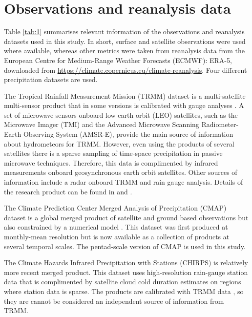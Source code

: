\section{Observations and reanalysis data}
Table \ref{tab:1} summarises relevant information of the observations and reanalysis datasets used in this study.
In short, surface and satellite observations were used where available, whereas other metrics were taken from reanalysis data from the
European Centre for Medium-Range Weather Forecasts (ECMWF): ERA-5, downloaded from \url{https://climate.copernicus.eu/climate-reanalysis}.
Four different precipitation datasets are used. 

The Tropical Rainfall Measurement Mission (TRMM) dataset is a multi-satellite multi-sensor product that in some versions is calibrated with gauge analyses \citep{huffman2007}. A set of microwave sensors onboard low earth orbit (LEO) satellites, such as the Microwave Imager (TMI) and the Advanced Microwave Scanning Radiometer-Earth Observing System (AMSR-E), provide the main source of information about hydrometeors for TRMM. However, even using the products of several satellites there is a sparse sampling of time-space precipitation  in passive microwave techniques. Therefore, this data is complimented by infrared measurements onboard geosynchronous earth orbit satellites. Other sources of information include a radar onboard TRMM and rain gauge analysis. Details of the research product can be found in \cite{huffman2007} and \cite{mission2011}.

The Climate Prediction Center Merged Analysis of Precipitation (CMAP) dataset is a global merged product of satellite and ground based observations but also constrained by a numerical model \citep{Xie2007}. This dataset was first produced at monthly-mean resolution \citep{xie1997} but is now available as a collection of products at several temporal scales. The pentad-scale version of CMAP is used in this study. %

The Climate Hazards Infrared Precipitation with Stations (CHIRPS) is relatively more recent merged product. This dataset uses high-resolution rain-gauge station data that is complimented by satellite cloud cold duration estimates on regions where station data is sparse. The products are calibrated with TRMM data \citep{funk2015}, so they are cannot be considered an independent source of information from TRMM.

